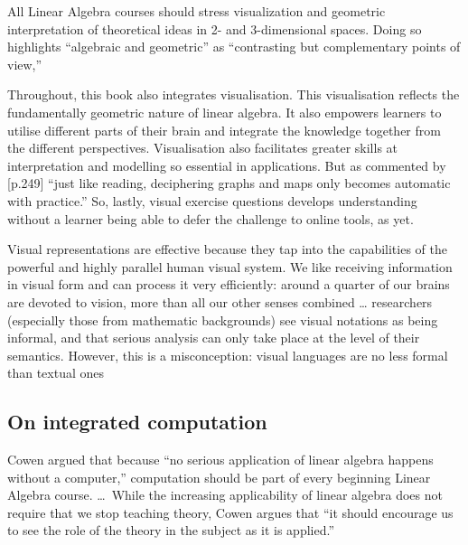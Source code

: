 \begin{quoted}{\cite[p.38]{CUPMguide2015}}
All Linear Algebra courses should stress visualization and geometric interpretation of theoretical ideas in 2- and 3-dimensional spaces. Doing so highlights ``algebraic and geometric'' as ``contrasting but complementary points of view,''
\end{quoted}


Throughout, this book also integrates visualisation.
This visualisation reflects the fundamentally geometric nature of linear algebra.  
It also empowers learners to utilise different parts of their brain and integrate the knowledge together from the different perspectives.
Visualisation also facilitates greater skills at interpretation and modelling so essential in applications.
But as commented by \cite{Fara2009} [p.249] ``just like reading, deciphering graphs and maps only becomes automatic with practice.''
So, lastly, visual exercise questions develops understanding without a learner being able to defer the challenge to online tools, as yet.  

\begin{quoted}{\cite{Moody2009}}
Visual representations are effective because they tap into the capabilities of the powerful and highly parallel human visual system.
We like receiving information in visual form and can process it very efficiently: around a quarter of our brains are devoted to vision, more than all our other senses combined  \ldots
researchers (especially those from mathematic backgrounds) see visual notations as being informal, and that serious analysis can only take place at the level of their semantics. 
However, this is a misconception: visual languages are no less formal than textual ones
\end{quoted}









\subsection*{On integrated computation}

\begin{quoted}{\cite[p.38]{CUPMguide2015}}
Cowen argued that because ``no serious application of linear algebra happens without a computer,'' computation should be part of every beginning Linear Algebra course. \ldots\
While the increasing applicability of linear algebra does not require that we stop teaching theory, Cowen argues that ``it should encourage us to see the role of the theory in the subject as it is applied.''
\end{quoted}


